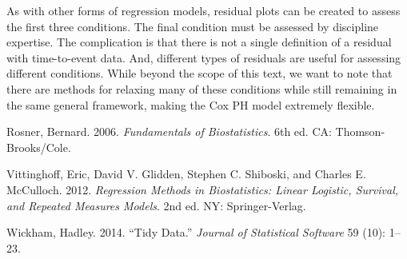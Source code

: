 \documentclass[
]{book}
\newlength{\cslhangindent}
\newlength{\cslentryspacingunit} %
\newenvironment{CSLReferences}[2] %
 {%
  \setlength{\parindent}{0pt}
  \ifodd #1
  \let\oldpar\par
  \def\par{\hangindent=\cslhangindent\oldpar}
  \fi
  \setlength{\parskip}{#2\cslentryspacingunit}
 }%
 {}
\theoremstyle{plain}
\theoremstyle{mydefn}
\theoremstyle{myexmpl}
\theoremstyle{remark}
\begin{document}
As with other forms of regression models, residual plots can be created to assess the first three conditions. The final condition must be assessed by discipline expertise. The complication is that there is not a single definition of a residual with time-to-event data. And, different types of residuals are useful for assessing different conditions. While beyond the scope of this text, we want to note that there are methods for relaxing many of these conditions while still remaining in the same general framework, making the Cox PH model extremely flexible.

\hypertarget{refs}{}
\begin{CSLReferences}{1}{0}
\leavevmode{}%
Rosner, Bernard. 2006. \emph{Fundamentals of Biostatistics}. 6th ed. CA: Thomson-Brooks/Cole.

\leavevmode{}%
Vittinghoff, Eric, David V. Glidden, Stephen C. Shiboski, and Charles E. McCulloch. 2012. \emph{Regression Methods in Biostatistics: Linear Logistic, Survival, and Repeated Measures Models}. 2nd ed. NY: Springer-Verlag.

\leavevmode{}%
Wickham, Hadley. 2014. {``Tidy Data.''} \emph{Journal of Statistical Software} 59 (10): 1--23.

\end{CSLReferences}
\end{document}
